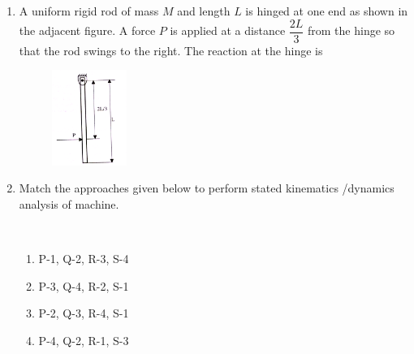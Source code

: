 \documentclass[journal]{IEEEtran}
\begin{document}
\begin{enumerate}[leftmargin=0pt]
\begin{enumerate}
\hfill{}
\end{enumerate}





\item A uniform rigid rod of mass $M$ and length $L$ is hinged at one end as shown in the adjacent figure. A force $P$ is applied at a distance $\dfrac{2L}{3}$ from the hinge so that the rod swings to the right. The reaction at the hinge is
\begin{figure}[h]
  \centering
  \includegraphics[width=0.23\textwidth]{Figs/image (10).png}
  \caption{}
  \label{fig:41}
\end{figure}
\begin{enumerate}
\hfill{}
\end{enumerate}
\item Match the approaches given below to perform stated kinematics /dynamics analysis of machine.\\
\begin{table}[h]
    \centering
    
\end{table}\\

\begin{enumerate}
  \item P-1, Q-2, R-3, S-4
  \item P-3, Q-4, R-2, S-1
  \item P-2, Q-3, R-4, S-1
  \item P-4, Q-2, R-1, S-3
\hfill{}
\end{enumerate}


\end{enumerate}
\end{document}
